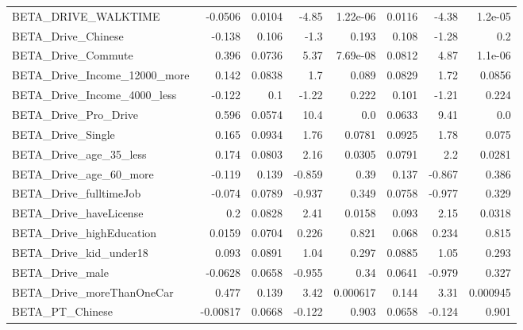\begin{tabular}{lrrrrrrr}
BETA\_DRIVE\_WALKTIME          &  -0.0506 &   0.0104 &   -4.85 & 1.22e-06 &        0.0116 &        -4.38 &       1.2e-05 \\
BETA\_Drive\_Chinese           &   -0.138 &    0.106 &    -1.3 &    0.193 &         0.108 &        -1.28 &           0.2 \\
BETA\_Drive\_Commute           &    0.396 &   0.0736 &    5.37 & 7.69e-08 &        0.0812 &         4.87 &       1.1e-06 \\
BETA\_Drive\_Income\_12000\_more &    0.142 &   0.0838 &     1.7 &    0.089 &        0.0829 &         1.72 &        0.0856 \\
BETA\_Drive\_Income\_4000\_less  &   -0.122 &      0.1 &   -1.22 &    0.222 &         0.101 &        -1.21 &         0.224 \\
BETA\_Drive\_Pro\_Drive         &    0.596 &   0.0574 &    10.4 &      0.0 &        0.0633 &         9.41 &           0.0 \\
BETA\_Drive\_Single            &    0.165 &   0.0934 &    1.76 &   0.0781 &        0.0925 &         1.78 &         0.075 \\
BETA\_Drive\_age\_35\_less       &    0.174 &   0.0803 &    2.16 &   0.0305 &        0.0791 &          2.2 &        0.0281 \\
BETA\_Drive\_age\_60\_more       &   -0.119 &    0.139 &  -0.859 &     0.39 &         0.137 &       -0.867 &         0.386 \\
BETA\_Drive\_fulltimeJob       &   -0.074 &   0.0789 &  -0.937 &    0.349 &        0.0758 &       -0.977 &         0.329 \\
BETA\_Drive\_haveLicense       &      0.2 &   0.0828 &    2.41 &   0.0158 &         0.093 &         2.15 &        0.0318 \\
BETA\_Drive\_highEducation     &   0.0159 &   0.0704 &   0.226 &    0.821 &         0.068 &        0.234 &         0.815 \\
BETA\_Drive\_kid\_under18       &    0.093 &   0.0891 &    1.04 &    0.297 &        0.0885 &         1.05 &         0.293 \\
BETA\_Drive\_male              &  -0.0628 &   0.0658 &  -0.955 &     0.34 &        0.0641 &       -0.979 &         0.327 \\
BETA\_Drive\_moreThanOneCar    &    0.477 &    0.139 &    3.42 & 0.000617 &         0.144 &         3.31 &      0.000945 \\
BETA\_PT\_Chinese              & -0.00817 &   0.0668 &  -0.122 &    0.903 &        0.0658 &       -0.124 &         0.901 \\

\end{tabular}
